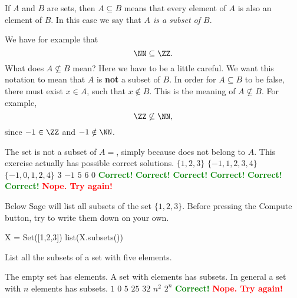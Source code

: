 \documentclass{article}
\newcommand{\red}[1]{\textcolor{red}{\textbf{#1}}}
\newcommand{\green}[1]{\textcolor{green}{\textbf{#1}}}
\begin{document}
If $A$ and $B$ are sets, then $A\subseteq B$ means that
every element of $A$ is also an element of $B$. In this case we say
that \emph{$A$ is a subset of $B$}.




We have
for example that 
$$
\NN \subseteq \ZZ.
$$
What does $A\not\subseteq B$ mean? Here we have to be a little
careful. We want this notation to mean that $A$ is \textbf{not} a
subset of $B$. In order for $A\subseteq B$ to be
false, there must exist $x\in A$, such that $x\notin B$. This
is the meaning of $A\not\subseteq B$. For example, 
$$
\ZZ\not\subseteq \NN,
$$
since $-1\in \ZZ$ and $-1\notin \NN$.

\begin{quizexercise}[showhide]
\begin{paraquiz}
  \question
  The set \box is not a subset of $A=$\box, simply because \box does not belong to $A$.
  This exercise actually has \box possible correct solutions.
  \answer
  $\{1, 2, 3\}$
  \answer
  $\{-1, 1, 2, 3, 4\}$
  \answer
  $\{-1, 0, 1, 2, 4\}$
  \answer
  $3$
  \answer
  $-1$
  \answer
  $5$
  \answer
  $6$
  \answer
  $0$
  \green{Correct!}
  \green{Correct!}
  \green{Correct!}
  \green{Correct!}
  \green{Correct!}
  \green{Correct!}
  \red{Nope. Try again!}
\end{paraquiz}
\end{quizexercise}



Below Sage will list all subsets of the set $\{1, 2, 3\}$. Before pressing
the Compute button, try to write them down on your own.

\begin{sage}
X = Set([1,2,3])
list(X.subsets())
\end{sage}


\beginshex
List all the subsets of a set with five elements.
\endshex

\begin{quizexercise}[showhide]
\begin{paraquiz}
  \question
  The empty set has \box elements. A set with \box elements has \box subsets. In general a set with
  $n$ elements has \box subsets.
  \answer
  $1$
  \answer
  $0$
  \answer
  $5$
  \answer
  $25$
  \answer
  $32$
  \answer
  $n^2$
  \answer
  $2^n$
  \green{Correct!}
  \red{Nope. Try again!}
\end{paraquiz}
\end{quizexercise}
\end{document}
